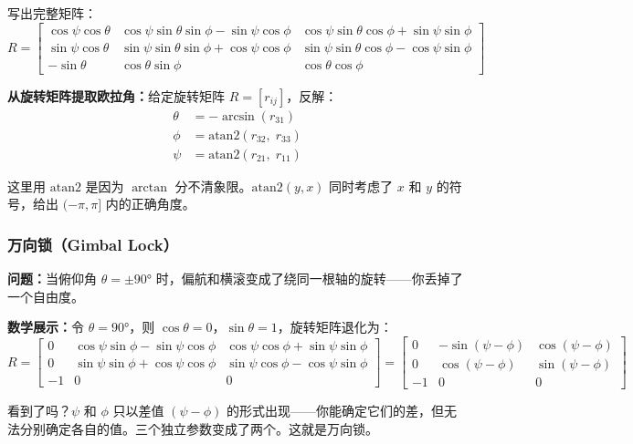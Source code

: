 写出完整矩阵：
\begin{equation}
R = \begin{bmatrix}
\cos\psi\cos\theta & \cos\psi\sin\theta\sin\phi - \sin\psi\cos\phi & \cos\psi\sin\theta\cos\phi + \sin\psi\sin\phi \\
\sin\psi\cos\theta & \sin\psi\sin\theta\sin\phi + \cos\psi\cos\phi & \sin\psi\sin\theta\cos\phi - \cos\psi\sin\phi \\
-\sin\theta & \cos\theta\sin\phi & \cos\theta\cos\phi
\end{bmatrix}
\end{equation}

\textbf{从旋转矩阵提取欧拉角：}给定旋转矩阵 $R = [r_{ij}]$，反解：
\begin{align}
\theta &= -\arcsin(r_{31}) \\
\phi &= \mathrm{atan2}(r_{32},\; r_{33}) \\
\psi &= \mathrm{atan2}(r_{21},\; r_{11})
\end{align}

这里用 $\mathrm{atan2}$ 是因为 $\arctan$ 分不清象限。$\mathrm{atan2}(y, x)$ 同时考虑了 $x$ 和 $y$ 的符号，给出 $(-\pi, \pi]$ 内的正确角度。

\subsubsection{万向锁（Gimbal Lock）}

\textbf{问题：}当俯仰角 $\theta = \pm 90°$ 时，偏航和横滚变成了绕同一根轴的旋转——你丢掉了一个自由度。

\textbf{数学展示：}令 $\theta = 90°$，则 $\cos\theta = 0$，$\sin\theta = 1$，旋转矩阵退化为：
\begin{equation}
R = \begin{bmatrix}
0 & \cos\psi\sin\phi - \sin\psi\cos\phi & \cos\psi\cos\phi + \sin\psi\sin\phi \\
0 & \sin\psi\sin\phi + \cos\psi\cos\phi & \sin\psi\cos\phi - \cos\psi\sin\phi \\
-1 & 0 & 0
\end{bmatrix}
= \begin{bmatrix}
0 & -\sin(\psi - \phi) & \cos(\psi - \phi) \\
0 & \cos(\psi - \phi) & \sin(\psi - \phi) \\
-1 & 0 & 0
\end{bmatrix}
\end{equation}

看到了吗？$\psi$ 和 $\phi$ 只以差值 $(\psi - \phi)$ 的形式出现——你能确定它们的差，但无法分别确定各自的值。三个独立参数变成了两个。这就是万向锁。

